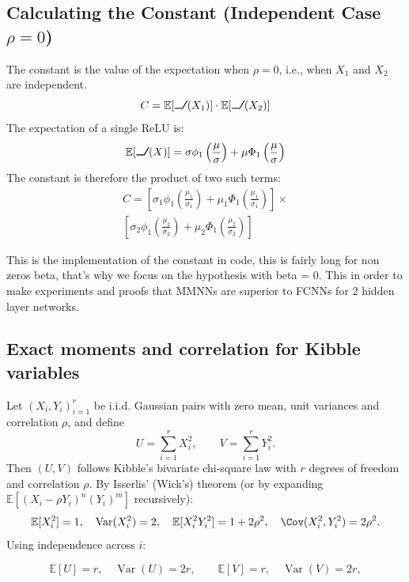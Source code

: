 \documentclass[a4paper]{article}
\DeclareRobustCommand{\ReLU}{\mathrel{\text{%
    \begin{tikzpicture}[baseline=(current bounding box.south)]
        \draw[thick] (0,0) -- (0.25,0) -- (0.4,0.25);
    \end{tikzpicture}}}\!\!}
\newcommand{\E}{\mathbb{E}}
\DeclareMathOperator{\Var}{Var}
\begin{document}
\subsection{Calculating the Constant (Independent Case $\rho=0$)}
The constant is the value of the expectation when $\rho=0$, i.e., when $X_1$ and $X_2$ are independent.
\[
C = \E[\ReLU(X_1)] \cdot \E[\ReLU(X_2)]
\]
The expectation of a single ReLU is:
\[
\E[\ReLU(X)] = \sigma\phi_1\left(\frac{\mu}{\sigma}\right) + \mu\Phi_1\left(\frac{\mu}{\sigma}\right)
\]
The constant is therefore the product of two such terms:
\begin{multline*}
C = \left[ \sigma_1\phi_1\left(\frac{\mu_1}{\sigma_1}\right) + \mu_1\Phi_1\left(\frac{\mu_1}{\sigma_1}\right) \right] \times \\ \left[ \sigma_2\phi_1\left(\frac{\mu_2}{\sigma_2}\right) + \mu_2\Phi_1\left(\frac{\mu_2}{\sigma_2}\right) \right]
\end{multline*}

This is the implementation of the constant in code, this is fairly long for non zeros beta, that's why we focus on the hypothesis with beta = 0.
This in order to make experiments and proofs that MMNNs are superior to FCNNs for 2 hidden layer networks.



\subsection{Exact moments and correlation for Kibble variables}

Let $(X_i,Y_i)_{i=1}^r$ be i.i.d. Gaussian pairs with zero mean, unit variances and correlation $\rho$, and define
\[
U=\sum_{i=1}^r X_i^2,\qquad V=\sum_{i=1}^r Y_i^2.
\]
Then $(U,V)$ follows Kibble's bivariate chi-square law with $r$ degrees of freedom and correlation $\rho$. By Isserlis' (Wick's) theorem (or by expanding $\E[(X_i-\rho Y_i)^n (Y_i)^m]$ recursively):
\[
\E[X_i^2]=1,\quad \Var(X_i^2)=2,\quad \E[X_i^2Y_i^2]=1+2\rho^2,\quad \Cov(X_i^2,Y_i^2)=2\rho^2.
\]
Using independence across $i$:

\[
\E[U]=r,\quad \Var(U)=2r,\qquad \E[V]=r,\quad \Var(V)=2r,
\]
\end{document}
